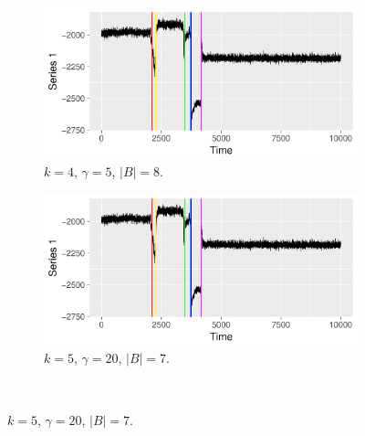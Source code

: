 \begin{figure}[H]
  \begin{subfigure}{0.45\textwidth}
    \centering
    \includegraphics[width = \textwidth]{best/best_k_4_gamma_5_colour.pdf}
    \caption{$k = 4 $, $\gamma = 5$, $|B| = 8$.}
  \label{fig:best_4}
  \end{subfigure}
 \begin{subfigure}{0.45\textwidth}
    \centering
    \includegraphics[width = \textwidth]{best/best_k_5_gamma_20_colour.pdf}
    \caption{$k = 5 $, $\gamma = 20$, $|B| = 7$.}
  \label{fig:best_5}
  \end{subfigure} \\


\end{figure}
